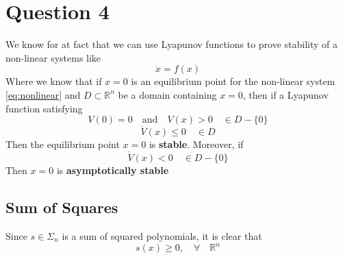 \chapter{Question 4}
We know for at fact that we can use Lyapunov functions to prove stability of a non-linear systems like
\begin{equation}
        \dot{x} = f(x)
        \label{eq:nonlinear}
\end{equation}
Where we know that if $x = 0$ is an equilibrium point for the non-linear system \ref{eq:nonlinear} and $D \subset \mathbb{R}^n$ be a domain containing $x = 0$, then if a Lyapunov function satisfying
\begin{equation}
        V(0) = 0 \quad \text{and} \quad V(x) > 0 \quad \in D - \{0\}
\end{equation}
\begin{equation}
        \dot{V}(x) \leq 0 \quad \in D
\end{equation}
Then the equilibrium point $x = 0$ is \textbf{stable}. Moreover, if
\begin{equation}
        \dot{V}(x) < 0 \quad \in D - \{0\}
\end{equation}
Then $x = 0$ is \textbf{asymptotically stable}

\section*{Sum of Squares}
Since $s \in \Sigma_{n}$ is a sum of squared polynomials, it is clear that 
\begin{equation}
        s(x) \geq 0, \quad \forall \quad \mathbb{R}^n
\end{equation}